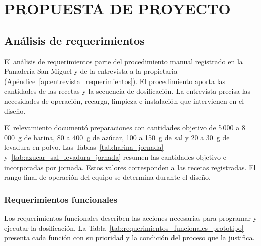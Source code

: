 \chapter{PROPUESTA DE PROYECTO}
\label{sec:propuesta}


\section{Análisis de requerimientos}
\label{sec:requerimientos_prototipo}

El análisis de requerimientos parte del procedimiento manual registrado en la
Panadería San Miguel y de la entrevista a la propietaria (Apéndice~\ref{ap:entrevista_requerimientos}). El
procedimiento aporta las cantidades de las recetas y la secuencia de
dosificación. La entrevista precisa las necesidades de operación,
recarga, limpieza e instalación que intervienen en el diseño.

El relevamiento documentó preparaciones con cantidades objetivo de
5\,000 a 8\,000~g de harina, 80 a 400~g de azúcar, 100 a 150~g de sal y
20 a 30~g de levadura en polvo. Las Tablas~\ref{tab:harina_jornada}
y~\ref{tab:azucar_sal_levadura_jornada} resumen las cantidades objetivo e
incorporadas por jornada. Estos valores corresponden a las recetas
registradas. El rango final de operación del equipo se determina durante
el diseño.

\subsection{Requerimientos funcionales}
\label{subsec:requerimientos_funcionales}

Los requerimientos funcionales describen las acciones necesarias para
programar y ejecutar la dosificación. La Tabla~\ref{tab:requerimientos_funcionales_prototipo}
presenta cada función con su prioridad y la condición del proceso que la
justifica.

